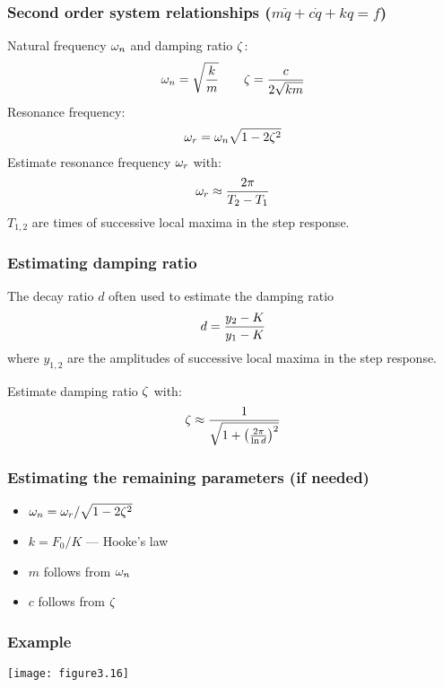 \documentclass{beamer-control}
\begin{document}
\begin{frame}
\frametitle{Second order system relationships ($m\ddot q + c \dot q + kq = f$)}
Natural frequency $\omega_n$ and damping ratio $\zeta$:
\begin{gather}
\omega_n = \sqrt{\frac{k}{m}} \qquad \zeta = \frac{c}{2\sqrt{km}} 
\end{gather}
Resonance frequency:
\begin{align}
\omega_r = \omega_n\sqrt{1-2\zeta^2}
\end{align}
Estimate resonance frequency $\omega_r$ with:
\begin{align}
\omega_r \approx \frac{2\pi}{T_2-T_1}
\end{align}
$T_{1,2}$ are times of successive local maxima in the step response.
\end{frame}

\begin{frame}
\frametitle{Estimating damping ratio}

The decay ratio $d$ often used to estimate the damping ratio
\begin{align}
d=\frac{y_2-K}{y_1-K}
\end{align}
where $y_{1,2}$ are the amplitudes of successive local maxima in the step response.
\bigskip

Estimate damping ratio $\zeta$ with:
\begin{align}
  \zeta \approx \frac{1}{\sqrt{1+\left(\frac{2\pi}{\ln d}\right)^2}}
\end{align}
\end{frame}

\begin{frame}
\frametitle{Estimating the remaining parameters (if needed)}
\begin{itemize}
\item
$\omega_n = \omega_r/\sqrt{1-2\zeta^2} $
\item
$k = F_0/K$ --- Hooke's law
\item
$m$ follows from $\omega_n$
\item
$c$ follows from $\zeta$
\end{itemize}
\end{frame}

\begin{frame}
\frametitle{Example}
\texttt{[image: figure3.16]}

\end{frame}
\end{document}
